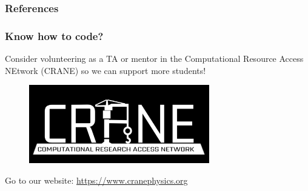 \documentclass[9pt]{beamer}
\begin{document}
  \begin{frame}
    \frametitle{}
  \end{frame}





\begin{frame}[allowframebreaks]
  \frametitle{References}
  
  {\footnotesize  }

\end{frame}

\appendix

\begin{frame}
    \frametitle{Know how to code?}
    Consider volunteering as a TA or mentor in the Computational Resource Access NEtwork (CRANE) so we can support more students!
    \begin{figure}
        \centering
        \includegraphics[width=0.7\textwidth]{images/CRANE_logo_inverted.png}
    \end{figure}
    Go to our website: \url{https://www.cranephysics.org}
\end{frame}

\end{document}
